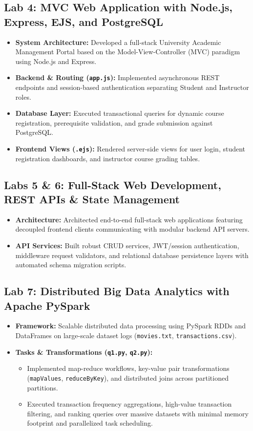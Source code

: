 \documentclass[10pt,a4paper]{article}
\begin{document}
\subsection{Lab 4: MVC Web Application with Node.js, Express, EJS, and PostgreSQL}
\begin{itemize}
    \item \textbf{System Architecture:} Developed a full-stack University Academic Management Portal based on the Model-View-Controller (MVC) paradigm using Node.js and Express.
    \item \textbf{Backend \& Routing (\texttt{app.js}):} Implemented asynchronous REST endpoints and session-based authentication separating Student and Instructor roles.
    \item \textbf{Database Layer:} Executed transactional queries for dynamic course registration, prerequisite validation, and grade submission against PostgreSQL.
    \item \textbf{Frontend Views (\texttt{.ejs}):} Rendered server-side views for user login, student registration dashboards, and instructor course grading tables.
\end{itemize}

\subsection{Labs 5 \& 6: Full-Stack Web Development, REST APIs \& State Management}
\begin{itemize}
    \item \textbf{Architecture:} Architected end-to-end full-stack web applications featuring decoupled frontend clients communicating with modular backend API servers.
    \item \textbf{API Services:} Built robust CRUD services, JWT/session authentication, middleware request validators, and relational database persistence layers with automated schema migration scripts.
\end{itemize}

\subsection{Lab 7: Distributed Big Data Analytics with Apache PySpark}
\begin{itemize}
    \item \textbf{Framework:} Scalable distributed data processing using PySpark RDDs and DataFrames on large-scale dataset logs (\texttt{movies.txt}, \texttt{transactions.csv}).
    \item \textbf{Tasks \& Transformations (\texttt{q1.py}, \texttt{q2.py}):}
    \begin{itemize}
        \item Implemented map-reduce workflows, key-value pair transformations (\texttt{mapValues}, \texttt{reduceByKey}), and distributed joins across partitioned partitions.
        \item Executed transaction frequency aggregations, high-value transaction filtering, and ranking queries over massive datasets with minimal memory footprint and parallelized task scheduling.
    \end{itemize}
\end{itemize}
\end{document}
